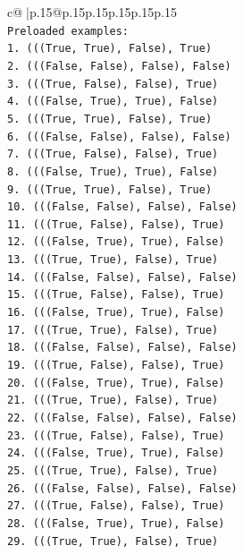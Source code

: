\documentclass{article}
\begin{document}
{\begin{supertabular}{c@{$\;$}|p{.15\linewidth}@{}p{.15\linewidth}p{.15\linewidth}p{.15\linewidth}p{.15\linewidth}p{.15\linewidth}}
{{{\\ 
\texttt{Preloaded examples:} \\
\texttt{1. (((True, True), False), True)} \\
\texttt{2. (((False, False), False), False)} \\
\texttt{3. (((True, False), False), True)} \\
\texttt{4. (((False, True), True), False)} \\
\texttt{5. (((True, True), False), True)} \\
\texttt{6. (((False, False), False), False)} \\
\texttt{7. (((True, False), False), True)} \\
\texttt{8. (((False, True), True), False)} \\
\texttt{9. (((True, True), False), True)} \\
\texttt{10. (((False, False), False), False)} \\
\texttt{11. (((True, False), False), True)} \\
\texttt{12. (((False, True), True), False)} \\
\texttt{13. (((True, True), False), True)} \\
\texttt{14. (((False, False), False), False)} \\
\texttt{15. (((True, False), False), True)} \\
\texttt{16. (((False, True), True), False)} \\
\texttt{17. (((True, True), False), True)} \\
\texttt{18. (((False, False), False), False)} \\
\texttt{19. (((True, False), False), True)} \\
\texttt{20. (((False, True), True), False)} \\
\texttt{21. (((True, True), False), True)} \\
\texttt{22. (((False, False), False), False)} \\
\texttt{23. (((True, False), False), True)} \\
\texttt{24. (((False, True), True), False)} \\
\texttt{25. (((True, True), False), True)} \\
\texttt{26. (((False, False), False), False)} \\
\texttt{27. (((True, False), False), True)} \\
\texttt{28. (((False, True), True), False)} \\
\texttt{29. (((True, True), False), True)} \\
}}}
\end{supertabular}}
\end{document}
